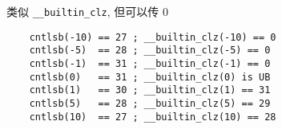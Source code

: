 类似 \verb|__builtin_clz|, 但可以传 \(0\)

\begin{verbatim}
    cntlsb(-10) == 27 ; __builtin_clz(-10) == 0
    cntlsb(-5)  == 28 ; __builtin_clz(-5) == 0
    cntlsb(-1)  == 31 ; __builtin_clz(-1) == 0
    cntlsb(0)   == 31 ; __builtin_clz(0) is UB
    cntlsb(1)   == 30 ; __builtin_clz(1) == 31
    cntlsb(5)   == 28 ; __builtin_clz(5) == 29
    cntlsb(10)  == 27 ; __builtin_clz(10) == 28
\end{verbatim}
